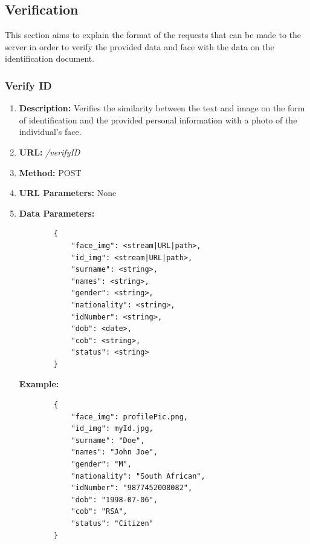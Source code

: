 \documentclass{article}
\begin{document}
    \subsection{Verification}
    This section aims to explain the format of the requests that can be made to the server in order to verify the provided data and face with the data on the identification document.
        \subsubsection{Verify ID}
        \begin{enumerate}
        	\item \textbf{Description:} Verifies the similarity between the text and image on the form of identification and the provided personal information with a photo of the individual's face.
        	\item \textbf{URL:} \textit{/verifyID}
        	\item \textbf{Method:} POST
        	\item \textbf{URL Parameters:} None
        	\item \textbf{Data Parameters:}
        
        	\begin{lstlisting}
        {
            "face_img": <stream|URL|path>,
            "id_img": <stream|URL|path>,
            "surname": <string>,
            "names": <string>,
            "gender": <string>,
            "nationality": <string>,
            "idNumber": <string>,
            "dob": <date>,
            "cob": <string>,
            "status": <string>
        }
        	\end{lstlisting}
        
        	\textbf{Example:}
        
        	\begin{lstlisting}
        {   
            "face_img": profilePic.png,
            "id_img": myId.jpg,
            "surname": "Doe",
            "names": "John Joe",
            "gender": "M",
            "nationality": "South African",
            "idNumber": "9877452008082",
            "dob": "1998-07-06",
            "cob": "RSA",
            "status": "Citizen"
        }
        	\end{lstlisting}
        	

\end{enumerate}
\end{document}
